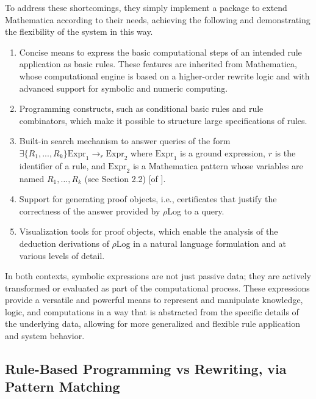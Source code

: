 To address these shortcomings, they simply implement a package to extend Mathematica according to their needs, achieving the following and demonstrating the flexibility of the system in this way.

\begin{center}
    \begin{displayquote}
    \begin{enumerate}
        \item Concise means to express the basic computational steps of an intended rule application as basic rules. These features are inherited from Mathematica, whose computational engine is based on a higher-order rewrite logic and with advanced support for symbolic and numeric computing.
        \item Programming constructs, such as conditional basic rules and rule combinators, which make it possible to structure large specifications of rules.
        \item Built-in search mechanism to answer queries of the form $\exists\{R_1,...,R_k\} \text{Expr}_1 \rightarrow_r \text{Expr}_2$ where $\text{Expr}_1$ is a ground expression, $r$ is the identifier of a rule, and $\text{Expr}_2$ is a Mathematica pattern whose variables are named $R_1, \ldots, R_k$ (see Section 2.2) [of \cite{marin_rule-based_nodate}].
        \item Support for generating proof objects, i.e., certificates that justify the correctness of the answer provided by $\rho$Log to a query.
        \item Visualization tools for proof objects, which enable the analysis of the deduction derivations of $\rho$Log in a natural language formulation and at various levels of detail.
    \end{enumerate}
        \cite{marin_rule-based_nodate}
    \end{displayquote} 
\end{center}

In both contexts, symbolic expressions are not just passive data; they are actively transformed or evaluated as part of the computational process. These expressions provide a versatile and powerful means to represent and manipulate knowledge, logic, and computations in a way that is abstracted from the specific details of the underlying data, allowing for more generalized and flexible rule application and system behavior.

\subsection{Rule-Based Programming vs Rewriting, via Pattern Matching}
\label{sec:rule_vs_rewriting}

